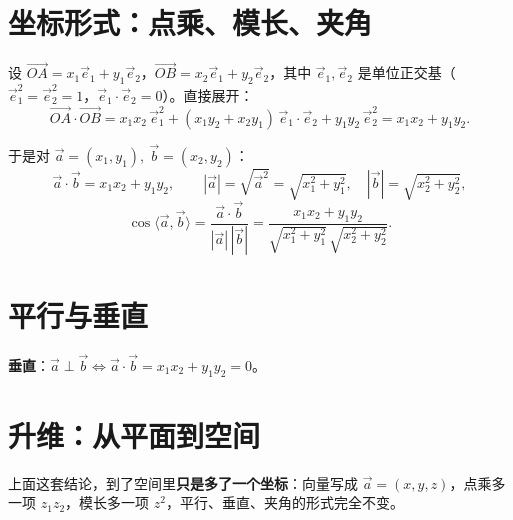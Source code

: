 \section{坐标形式：点乘、模长、夹角}

设 $\vec{OA}=x_1\vec e_1+y_1\vec e_2$，$\vec{OB}=x_2\vec e_1+y_2\vec e_2$，其中 $\vec e_1,\vec e_2$ 是单位正交基（$\vec e_1^2=\vec e_2^2=1$，$\vec e_1\cdot\vec e_2=0$）。直接展开：
\[
\vec{OA}\cdot\vec{OB}=x_1x_2\,\vec e_1^2+(x_1y_2+x_2y_1)\,\vec e_1\cdot\vec e_2+y_1y_2\,\vec e_2^2=x_1x_2+y_1y_2.
\]

于是对 $\vec a=(x_1,y_1),\ \vec b=(x_2,y_2)$：
\[
\vec a\cdot\vec b=x_1x_2+y_1y_2,\qquad
|\vec a|=\sqrt{\vec a^2}=\sqrt{x_1^2+y_1^2},\quad |\vec b|=\sqrt{x_2^2+y_2^2},
\]
\[
\cos\langle\vec a,\vec b\rangle=\frac{\vec a\cdot\vec b}{|\vec a|\,|\vec b|}=\frac{x_1x_2+y_1y_2}{\sqrt{x_1^2+y_1^2}\,\sqrt{x_2^2+y_2^2}}.
\]

\section{平行与垂直}


\textbf{垂直}：$\vec a\perp\vec b\iff\vec a\cdot\vec b=x_1x_2+y_1y_2=0$。

\section{升维：从平面到空间}

上面这套结论，到了空间里\textbf{只是多了一个坐标}：向量写成 $\vec a=(x,y,z)$，点乘多一项 $z_1z_2$，模长多一项 $z^2$，平行、垂直、夹角的形式完全不变。
